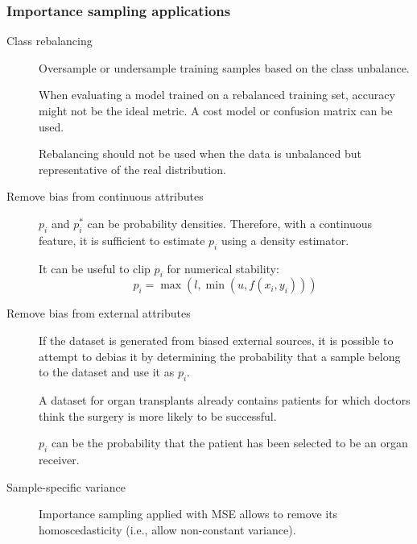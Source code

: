 \subsubsection{Importance sampling applications}

\begin{description}
    \item[Class rebalancing]
        Oversample or undersample training samples based on the class unbalance.

        \begin{remark}
            When evaluating a model trained on a rebalanced training set, accuracy might not be the ideal metric. A cost model or confusion matrix can be used.
        \end{remark}

        \begin{remark}
            Rebalancing should not be used when the data is unbalanced but representative of the real distribution.
        \end{remark}

    \item[Remove bias from continuous attributes]
        $p_i$ and $p_i^*$ can be probability densities. Therefore, with a continuous feature, it is sufficient to estimate $p_i$ using a density estimator.

        \begin{remark}
            It can be useful to clip $p_i$ for numerical stability:
            \[ p_i = \max(l, \min(u, f(x_i, y_i))) \]
        \end{remark}

    \item[Remove bias from external attributes]
        If the dataset is generated from biased external sources, it is possible to attempt to debias it by determining the probability that a sample belong to the dataset and use it as $p_i$.

        \begin{example}
            A dataset for organ transplants already contains patients for which doctors think the surgery is more likely to be successful.

            $p_i$ can be the probability that the patient has been selected to be an organ receiver.
        \end{example}

    \item[Sample-specific variance]
        Importance sampling applied with MSE allows to remove its homoscedasticity (i.e., allow non-constant variance).


\end{description}
